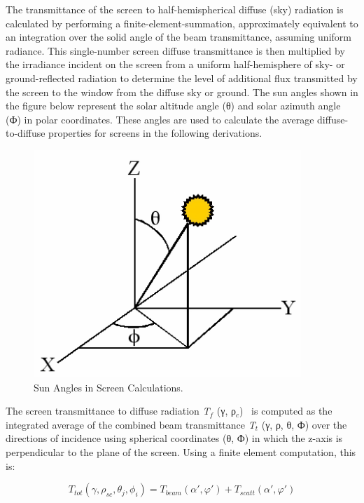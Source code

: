 The transmittance of the screen to half-hemispherical diffuse (sky) radiation is calculated by performing a finite-element-summation, approximately equivalent to an integration over the solid angle of the beam transmittance, assuming uniform radiance. This single-number screen diffuse transmittance is then multiplied by the irradiance incident on the screen from a uniform half-hemisphere of sky- or ground-reflected radiation to determine the level of additional flux transmitted by the screen to the window from the diffuse sky or ground. The sun angles shown in the figure below represent the solar altitude angle (θ) and solar azimuth angle (Ф) in polar coordinates. These angles are used to calculate the average diffuse-to-diffuse properties for screens in the following derivations.

\begin{figure}[hbtp] %
\centering
\includegraphics[width=0.9\textwidth, height=0.9\textheight, keepaspectratio=true]{media/image1210.png}
\caption{Sun Angles in Screen Calculations. \protect \label{fig:sun-angles-in-screen-calculations.}}
\end{figure}

The screen transmittance to diffuse radiation \emph{T\(_{f}\)} (γ, ρ\(_{c}\))~ is computed as the integrated average of the combined beam transmittance \emph{T\(_{t}\)} (γ, ρ, θ, Ф) over the directions of incidence using spherical coordinates (θ, Ф) in which the z-axis is perpendicular to the plane of the screen. Using a finite element computation, this is:

\begin{equation}
{T_{tot}}(\gamma ,{\rho_{sc}},{\theta_j},{\phi_i}) = {T_{beam}}\left( {\alpha ',\varphi '} \right) + {T_{scatt}}\left( {\alpha ',\varphi '} \right)
\end{equation}

